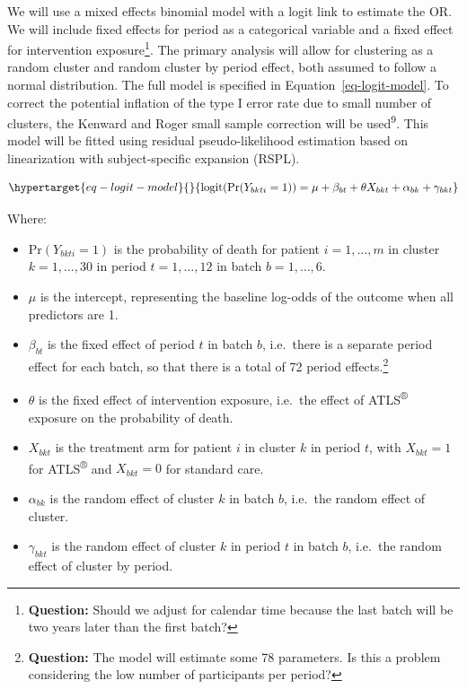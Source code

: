 \documentclass[
]{scrartcl}
\providecommand{\tightlist}{%
  \setlength{\itemsep}{0pt}\setlength{\parskip}{0pt}}\usepackage{longtable,booktabs,array}
\begin{document}
We will use a mixed effects binomial model with a logit link to estimate
the OR. We will include fixed effects for period as a categorical
variable and a fixed effect for intervention exposure\footnote{\textbf{Question:}
  Should we adjust for calendar time because the last batch will be two
  years later than the first batch?}. The primary analysis will allow
for clustering as a random cluster and random cluster by period effect,
both assumed to follow a normal distribution. The full model is
specified in Equation~\ref{eq-logit-model}. To correct the potential
inflation of the type I error rate due to small number of clusters, the
Kenward and Roger small sample correction will be
used\textsuperscript{9}. This model will be fitted using residual
pseudo-likelihood estimation based on linearization with
subject-specific expansion (RSPL).

\begin{equation}\protect\hypertarget{eq-logit-model}{}{
\text{logit}(\text{Pr}(Y_{bkti} = 1)) = \mu + \beta_{bt} + \theta X_{bkt} + \alpha_{bk} + \gamma_{bkt} 
}\label{eq-logit-model}\end{equation}

Where:

\begin{itemize}
\tightlist
\item
  \(\text{Pr}(Y_{bkti} = 1)\) is the probability of death for patient
  \(i = 1, \dotsc,m\) in cluster \(k = 1, \dotsc, 30\) in period
  \(t = 1, \dotsc, 12\) in batch \(b = 1, \dotsc, 6\).
\item
  \(\mu\) is the intercept, representing the baseline log-odds of the
  outcome when all predictors are 1.
\item
  \(\beta_{bt}\) is the fixed effect of period \(t\) in batch \(b\),
  i.e.~there is a separate period effect for each batch, so that there
  is a total of 72 period effects.\footnote{\textbf{Question:} The model
    will estimate some 78 parameters. Is this a problem considering the
    low number of participants per period?}
\item
  \(\theta\) is the fixed effect of intervention exposure, i.e.~the
  effect of ATLS\textsuperscript{®} exposure on the probability of
  death.
\item
  \(X_{bkt}\) is the treatment arm for patient \(i\) in cluster \(k\) in
  period \(t\), with \(X_{bkt} = 1\) for ATLS\textsuperscript{®} and
  \(X_{bkt} = 0\) for standard care.
\item
  \(\alpha_{bk}\) is the random effect of cluster \(k\) in batch \(b\),
  i.e.~the random effect of cluster.
\item
  \(\gamma_{bkt}\) is the random effect of cluster \(k\) in period \(t\)
  in batch \(b\), i.e.~the random effect of cluster by period.
\end{itemize}
\end{document}
